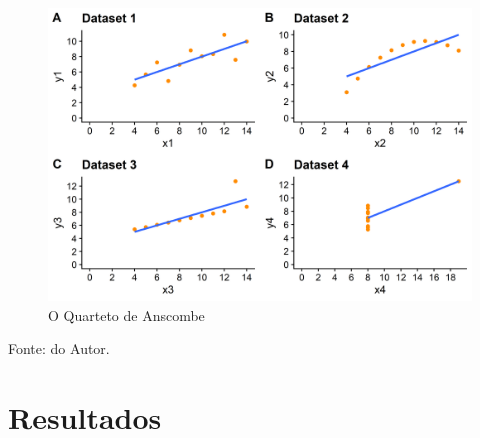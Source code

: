 \documentclass[
	12pt,				%
	oneside,			%
	a4paper,			%
	chapter=TITLE,		%
	section=TITLE,		%
	english,			%
	brazil				%
	]{abntex2}
\newcommand{\bcenter}{\begin{center}}
\newcommand{\ecenter}{\end{center}}
\begin{document}
\begin{figure}[H]

{\centering \includegraphics[width=1\linewidth]{images/anscombe2-1} 

}

\caption{O Quarteto de Anscombe}\label{fig:anscombe2}
\end{figure}
\bcenter

Fonte: do Autor.
\ecenter

\hypertarget{resultados}{%
\chapter{Resultados}\label{resultados}}
\end{document}
